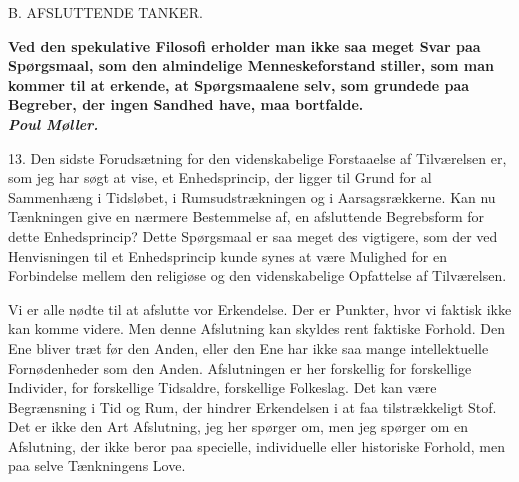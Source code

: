\documentclass[12pt,a4paper,openany]{book}
\newcommand{\opage}[1]{\marginnote{\footnotesize\textit{[#1]}}}
\begin{document}
\clearpage

\opage{34}\begin{center}B. AFSLUTTENDE TANKER.\end{center}

\begin{flushright}\begin{minipage}{0.55\textwidth}\small\bfseries
Ved den spekulative Filosofi erholder man ikke saa meget Svar paa
Spørgsmaal, som den almindelige Menneskeforstand stiller, som man kommer
til at erkende, at Spørgsmaalene selv, som grundede paa Begreber, der
ingen Sandhed have, maa bortfalde.\\
\hfill\textit{Poul Møller.}
\end{minipage}\end{flushright}

13. Den sidste Forudsætning for den videnskabelige Forstaaelse af
Tilværelsen er, som jeg har søgt at vise, et Enhedsprincip, der ligger
til Grund for al Sammenhæng i Tidsløbet, i Rumsudstrækningen og i
Aarsagsrækkerne. Kan nu Tænkningen give en nærmere Bestemmelse af, en
afsluttende Begrebsform for dette Enhedsprincip? Dette Spørgsmaal er saa
meget des vigtigere, som der ved Henvisningen til et Enhedsprincip kunde
synes at være Mulighed for en Forbindelse mellem den religiøse og den
videnskabelige Opfattelse af Tilværelsen.

Vi er alle nødte til at afslutte vor Erkendelse. Der er Punkter, hvor vi
faktisk ikke kan komme videre. Men denne Afslutning kan skyldes rent
faktiske Forhold. Den Ene bliver træt før den Anden, eller den Ene har
ikke saa mange intellektuelle Fornødenheder som den Anden. Afslutningen
er her forskellig for forskellige Individer, for forskellige Tidsaldre,
forskellige Folkeslag. Det kan være Begrænsning i Tid og Rum, der
hindrer Erkendelsen i at faa tilstrækkeligt Stof. Det er ikke den Art
Afslutning, jeg her spørger om, men jeg spørger om en Afslutning, der
ikke beror paa specielle, individuelle eller historiske Forhold, men paa
selve Tænkningens Love.
\end{document}
